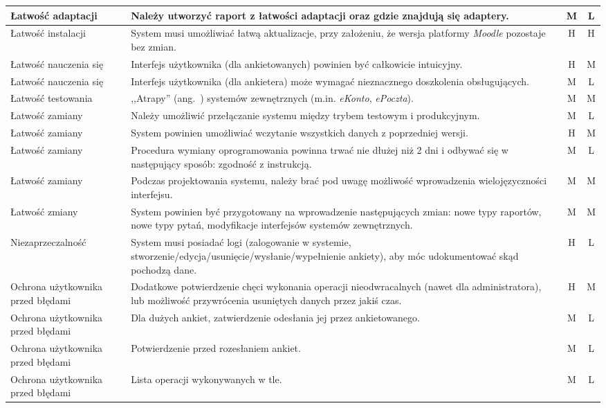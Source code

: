 \begin{center}
\begin{longtable}{ | p{4cm} | p{9cm} | c | c | }
%
Łatwość adaptacji & Należy utworzyć raport z łatwości adaptacji oraz gdzie znajdują się adaptery. & M & L \\ \hline
%
Łatwość instalacji & System musi umożliwiać łatwą aktualizacje, przy założeniu, że wersja platformy \textit{Moodle} pozostaje bez zmian. & H & H \\ \hline
%
Łatwość nauczenia się & Interfejs użytkownika (dla ankietowanych) powinien być całkowicie intuicyjny. & H & M \\ \hline
Łatwość nauczenia się & Interfejs użytkownika (dla ankietera) może wymagać nieznacznego doszkolenia obsługujących. & M & L \\ \hline
%
Łatwość testowania & ,,Atrapy'' (ang.~{mock}) systemów zewnętrznych (m.in. \textit{eKonto}, \textit{ePoczta}). & M & M \\ \hline
Łatwość zamiany & Należy umożliwić przełączanie systemu między trybem testowym i produkcyjnym. & M & L \\ \hline
%
Łatwość zamiany & System powinien umożliwiać wczytanie wszystkich danych z poprzedniej wersji. & H & M \\ \hline
Łatwość zamiany & Procedura wymiany oprogramowania powinna trwać nie dłużej niż 2 dni i odbywać się w następujący sposób: zgodność z instrukcją. & M & L \\ \hline
Łatwość zamiany & Podczas projektowania systemu, należy brać pod uwagę możliwość wprowadzenia wielojęzyczności interfejsu. & M & M \\ \hline
%
Łatwość zmiany & System powinien być przygotowany na wprowadzenie następujących zmian: nowe typy raportów, nowe typy pytań, modyfikacje interfejsów systemów zewnętrznych. & M & M \\ \hline
%
Niezaprzeczalność & System musi posiadać logi (zalogowanie w systemie, stworzenie\slash edycja\slash usunięcie\slash wysłanie\slash wypełnienie ankiety), aby móc udokumentować skąd pochodzą dane. & H & L \\ \hline
%
Ochrona użytkownika przed błędami & Dodatkowe potwierdzenie chęci wykonania operacji nieodwracalnych (nawet dla administratora), lub możliwość przywrócenia usuniętych danych przez jakiś czas. & H & M \\ \hline
Ochrona użytkownika przed błędami & Dla dużych ankiet, zatwierdzenie odesłania jej przez ankietowanego. & M & L \\ \hline
Ochrona użytkownika przed błędami & Potwierdzenie przed rozesłaniem ankiet. & M & L \\ \hline
Ochrona użytkownika przed błędami & Lista operacji wykonywanych w tle. & M & L \\ \hline

\end{longtable}
\end{center}
